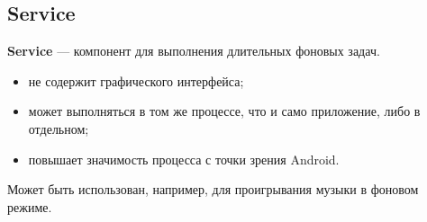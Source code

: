 \subsection{Service}
\textbf{Service} --- компонент для выполнения длительных фоновых задач.

\begin{itemize}
	\item не содержит графического интерфейса;
	\item может выполняться в том же процессе, что и само приложение, либо в отдельном;
	\item повышает значимость процесса с точки зрения Android.
\end{itemize}

Может быть использован, например, для проигрывания музыки в фоновом режиме.